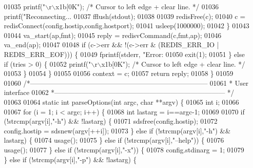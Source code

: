 \begin{DoxyCode}
{{{{{{{{{{{{{{{{{{{{{{{{{{{01035             printf(\textcolor{stringliteral}{"\(\backslash\)r\(\backslash\)x1b[0K"}); \textcolor{comment}{/* Cursor to left edge + clear line. */}
01036             printf(\textcolor{stringliteral}{"Reconnecting... %
01037             fflush(stdout);
01038 
01039             redisFree(c);
01040             c = redisConnect(config.hostip,config.hostport);
01041             usleep(1000000);
01042         \}
01043 
01044         va\_start(ap,fmt);
01045         reply = redisvCommand(c,fmt,ap);
01046         va\_end(ap);
01047 
01048         \textcolor{keywordflow}{if} (c->err && !(c->err & (REDIS\_ERR\_IO | REDIS\_ERR\_EOF))) \{
01049             fprintf(stderr, \textcolor{stringliteral}{"Error: %
01050             exit(1);
01051         \} \textcolor{keywordflow}{else} \textcolor{keywordflow}{if} (tries > 0) \{
01052             printf(\textcolor{stringliteral}{"\(\backslash\)r\(\backslash\)x1b[0K"}); \textcolor{comment}{/* Cursor to left edge + clear line. */}
01053         \}
01054     \}
01055 
01056     context = c;
01057     \textcolor{keywordflow}{return} reply;
01058 \}
01059 
01060 \textcolor{comment}{/*------------------------------------------------------------------------------}
01061 \textcolor{comment}{ * User interface}
01062 \textcolor{comment}{ *--------------------------------------------------------------------------- */}
01063 
01064 \textcolor{keyword}{static} \textcolor{keywordtype}{int} parseOptions(\textcolor{keywordtype}{int} argc, \textcolor{keywordtype}{char} **argv) \{
01065     \textcolor{keywordtype}{int} i;
01066 
01067     \textcolor{keywordflow}{for} (i = 1; i < argc; i++) \{
01068         \textcolor{keywordtype}{int} lastarg = i==argc-1;
01069 
01070         \textcolor{keywordflow}{if} (!strcmp(argv[i],\textcolor{stringliteral}{"-h"}) && !lastarg) \{
01071             sdsfree(config.hostip);
01072             config.hostip = sdsnew(argv[++i]);
01073         \} \textcolor{keywordflow}{else} \textcolor{keywordflow}{if} (!strcmp(argv[i],\textcolor{stringliteral}{"-h"}) && lastarg) \{
01074             usage();
01075         \} \textcolor{keywordflow}{else} \textcolor{keywordflow}{if} (!strcmp(argv[i],\textcolor{stringliteral}{"--help"})) \{
01076             usage();
01077         \} \textcolor{keywordflow}{else} \textcolor{keywordflow}{if} (!strcmp(argv[i],\textcolor{stringliteral}{"-x"})) \{
01078             config.stdinarg = 1;
01079         \} \textcolor{keywordflow}{else} \textcolor{keywordflow}{if} (!strcmp(argv[i],\textcolor{stringliteral}{"-p"}) && !lastarg) \{
}}}}}}}}}}}}}}}}}}}}}}}}}}}}}
\end{DoxyCode}
